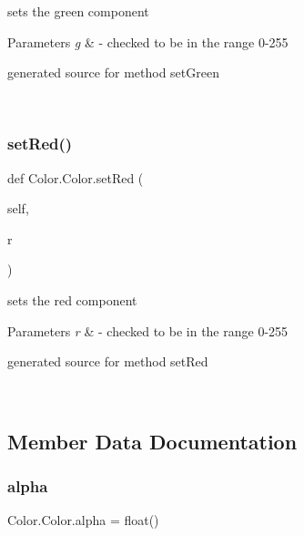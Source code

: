 sets the green component 


\begin{DoxyParams}{Parameters}
{\em g} & -\/ checked to be in the range 0-\/255\begin{DoxyVerb}generated source for method setGreen \end{DoxyVerb}
 \\
\hline
\end{DoxyParams}
\hypertarget{class_color_1_1_color_ac9000b54846a4d69171dd81172e53f96}{}\label{class_color_1_1_color_ac9000b54846a4d69171dd81172e53f96} 
\subsubsection{\texorpdfstring{set\+Red()}{setRed()}}
{\footnotesize\ttfamily def Color.\+Color.\+set\+Red (\begin{DoxyParamCaption}\item[{}]{self,  }\item[{}]{r }\end{DoxyParamCaption})}



sets the red component 


\begin{DoxyParams}{Parameters}
{\em r} & -\/ checked to be in the range 0-\/255\begin{DoxyVerb}generated source for method setRed \end{DoxyVerb}
 \\
\hline
\end{DoxyParams}


\subsection{Member Data Documentation}
\hypertarget{class_color_1_1_color_a27e8f74882075cc184a9bbc2da65f8a3}{}\label{class_color_1_1_color_a27e8f74882075cc184a9bbc2da65f8a3} 
\subsubsection{\texorpdfstring{alpha}{alpha}}
{\footnotesize\ttfamily Color.\+Color.\+alpha = float()\hspace{0.3cm}{\ttfamily [static]}}

